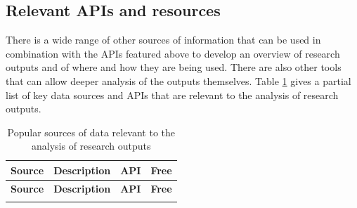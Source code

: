 \documentclass[]{krantz}
\begin{document}
\subsection{Relevant APIs and
resources}\label{relevant-apis-and-resources}

There is a wide range of other sources of information that can be used
in combination with the APIs featured above to develop an overview of
research outputs and of where and how they are being used. There are
also other tools that can allow deeper analysis of the outputs
themselves. Table \ref{tab:table2-1} gives a partial list of key data
sources and APIs that are relevant to the analysis of research outputs.

\begin{longtable}[]{@{}llcc@{}}
\caption{\label{tab:table2-1} Popular sources of data relevant to the
analysis of research outputs}\tabularnewline
\toprule
\begin{minipage}[b]{0.10\columnwidth}\raggedright\strut
\textbf{Source}\strut
\end{minipage} & \begin{minipage}[b]{0.74\columnwidth}\raggedright\strut
\textbf{Description}\strut
\end{minipage} & \begin{minipage}[b]{0.02\columnwidth}\centering\strut
\textbf{API}\strut
\end{minipage} & \begin{minipage}[b]{0.02\columnwidth}\centering\strut
\textbf{Free}\strut
\end{minipage}\tabularnewline
\midrule
\endfirsthead
\toprule
\begin{minipage}[b]{0.10\columnwidth}\raggedright\strut
\textbf{Source}\strut
\end{minipage} & \begin{minipage}[b]{0.74\columnwidth}\raggedright\strut
\textbf{Description}\strut
\end{minipage} & \begin{minipage}[b]{0.02\columnwidth}\centering\strut
\textbf{API}\strut
\end{minipage} & \begin{minipage}[b]{0.02\columnwidth}\centering\strut
\textbf{Free}\strut
\end{minipage}\tabularnewline
\midrule
\endhead
\begin{minipage}[t]{0.10\columnwidth}\raggedright\strut
\strut
\end{minipage} & \begin{minipage}[t]{0.74\columnwidth}\raggedright\strut

\end{minipage}
\end{longtable}
\end{document}

